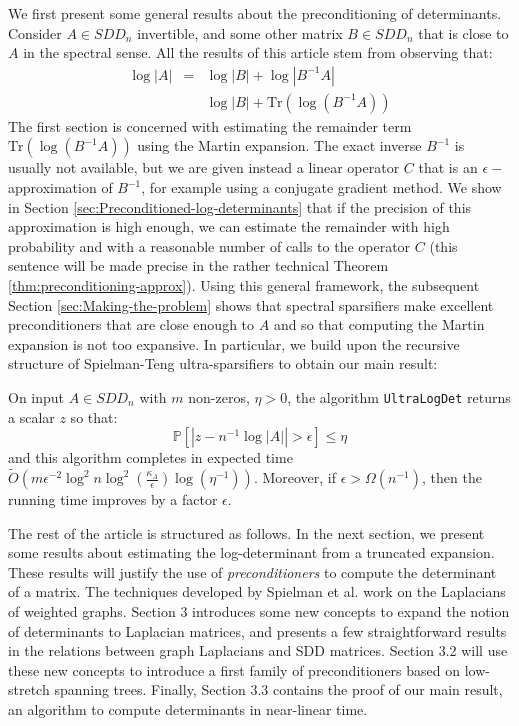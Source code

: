 We first present some general results about the preconditioning of
determinants. Consider $A\in SDD_{n}$ invertible, and some other
matrix $B\in SDD_{n}$ that is close to $A$ in the spectral sense.
All the results of this article stem from observing that: 
\begin{eqnarray*}
\log\left|A\right| & = & \log\left|B\right|+\log\left|B^{-1}A\right|\\
 &  & \log\left|B\right|+\text{Tr}\left(\log\left(B^{-1}A\right)\right)
\end{eqnarray*}
The first section is concerned with estimating the remainder term
$\text{Tr}\left(\log\left(B^{-1}A\right)\right)$ using the Martin
expansion. The exact inverse $B^{-1}$ is usually not available, but
we are given instead a linear operator $C$ that is an $\epsilon-$approximation
of $B^{-1}$, for example using a conjugate gradient method. We show
in Section \ref{sec:Preconditioned-log-determinants} that if the
precision of this approximation is high enough, we can estimate the
remainder with high probability and with a reasonable number of calls
to the operator $C$ (this sentence will be made precise in the rather
technical Theorem \ref{thm:preconditioning-approx}). Using this general
framework, the subsequent Section \ref{sec:Making-the-problem} shows
that spectral sparsifiers make excellent preconditioners that are
close enough to $A$ and so that computing the Martin expansion is
not too expansive. In particular, we build upon the recursive structure
of Spielman-Teng ultra-sparsifiers to obtain our main result:

\begin{theorem}\label{thm:ultra_main}On input $A\in SDD_{n}$ with
$m$ non-zeros, $\eta>0$, the algorithm \texttt{UltraLogDet} returns
a scalar $z$ so that: 
\[
\mathbb{P}\left[\left|z-n^{-1}\log\left|A\right|\right|>\epsilon\right]\leq\eta
\]
and this algorithm completes in expected time $\tilde{O}\left(m\epsilon^{-2}\log^{2}n\log^{2}\left(\frac{\kappa_{A}}{\epsilon}\right)\log\left(\eta^{-1}\right)\right)$.
Moreover, if $\epsilon>\Omega(n^{-1})$, then the running time improves
by a factor $\epsilon$.

\end{theorem}

The rest of the article is structured as follows. In the next section,
we present some results about estimating the log-determinant from
a truncated expansion. These results will justify the use of \emph{preconditioners
}to compute the determinant of a matrix. The techniques developed
by Spielman et al. work on the Laplacians of weighted graphs. Section
3 introduces some new concepts to expand the notion of determinants
to Laplacian matrices, and presents a few straightforward results
in the relations between graph Laplacians and SDD matrices. Section
3.2 will use these new concepts to introduce a first family of preconditioners
based on low-stretch spanning trees. Finally, Section 3.3 contains
the proof of our main result, an algorithm to compute determinants
in near-linear time. 
